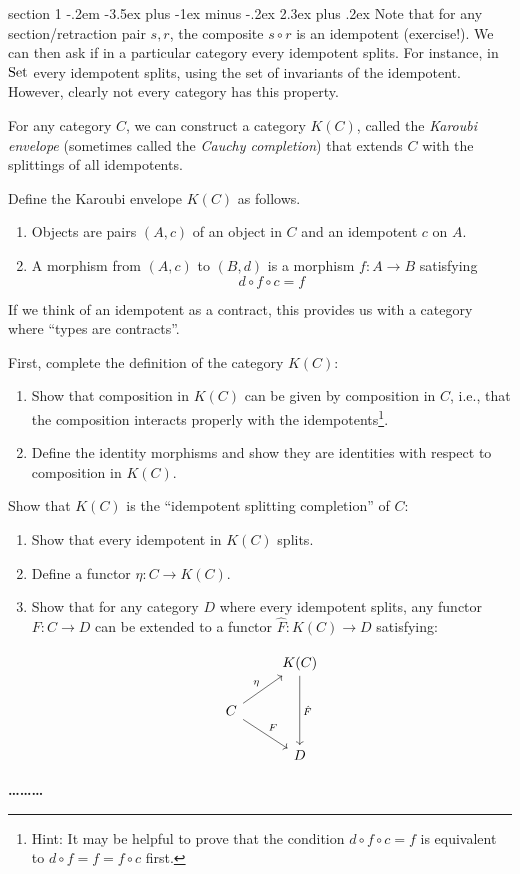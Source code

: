 \documentclass[12pt]{article}
\makeatletter
\newenvironment{problem}{\@startsection
       {section}
       {1}
       {-.2em}
       {-3.5ex plus -1ex minus -.2ex}
       {2.3ex plus .2ex}
       {\pagebreak[3]%
       \large\bf\noindent{Problem }
       }
       }
       {%
       \begin{center}\large\bf \ldots\ldots\ldots\end{center}}
\makeatother
\begin{document}
\begin{problem}{}
  Note that for any section/retraction pair $s, r$, the composite $s
  \circ r$ is an idempotent (exercise!). We can then ask if in a
  particular category every idempotent splits. For instance, in $\textrm{Set}$
  every idempotent splits, using the set of invariants of the
  idempotent. However, clearly not every category has this property.
  
  For any category $C$, we can construct a category $K(C)$, called the
  \emph{Karoubi envelope} (sometimes called the \emph{Cauchy
  completion}) that extends $C$ with the splittings of all
  idempotents.

  Define the Karoubi envelope $K(C)$ as follows.
  \begin{enumerate}
  \item Objects are pairs $(A, c)$ of an object in $C$ and an idempotent $c$ on $A$.
  \item A morphism from $(A, c)$ to $(B, d)$ is a morphism $f : A \to B$ satisfying
    \[ d \circ f \circ c = f \]
  \end{enumerate}

  If we think of an idempotent as a contract, this provides us with a
  category where ``types are contracts''.

  First, complete the definition of the category $K(C)$:
  \begin{enumerate}
  \item Show that composition in $K(C)$ can be given by composition in
    $C$, i.e., that the composition interacts properly with the
    idempotents\footnote{Hint: It may be helpful to prove that the
    condition $d \circ f \circ c = f$ is equivalent to $d \circ f = f
    = f \circ c$ first.}.
  \item Define the identity morphisms and show they are identities
    with respect to composition in $K(C)$.
  \end{enumerate}

  Show that $K(C)$ is the ``idempotent splitting completion'' of $C$:
  \begin{enumerate}
  \item Show that every idempotent in $K(C)$ splits.
  \item Define a functor $\eta : C \to K(C)$.
  \item Show that for any category $D$ where every idempotent splits,
    any functor $F : C \to D$ can be extended to a functor $\hat F :
    K(C) \to D$ satisfying:

    \[ %
    \begin{tikzcd}
      & K(C) \arrow[dd, "\hat F"] \\
      C \arrow[rd, "F"] \arrow[ru, "\eta"] &                           \\
      & D                        
    \end{tikzcd} \]


\end{enumerate}
\end{problem}
\end{document}

